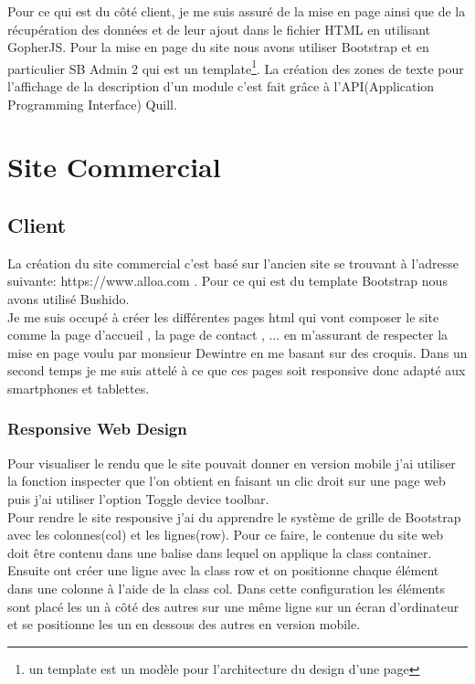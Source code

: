 \documentclass[12pt,a4paper]{report}
\begin{document}
Pour ce qui est du côté client, je me suis assuré de la mise en page ainsi que de la  récupération des données et de leur ajout dans le fichier HTML en utilisant GopherJS. Pour la mise en page du site nous avons utiliser Bootstrap et en particulier SB Admin 2 qui est un template\footnote{un template est un modèle pour l'architecture du design d'une page }. La création des zones de texte pour l'affichage de la description d'un module c'est fait grâce à l'API(Application Programming Interface) Quill.

\section{Site Commercial}

\subsection{Client}

La création du site commercial c'est basé sur l'ancien site  se trouvant à l'adresse suivante: https://www.alloa.com . Pour ce qui est du template Bootstrap nous avons utilisé Bushido. \\

 Je me suis occupé à créer les différentes pages html qui vont composer le site comme la page d'accueil , la page de contact , ... en m'assurant de respecter la mise en page voulu par monsieur Dewintre en me basant sur des croquis. Dans un second temps je me suis attelé à ce que ces pages soit responsive donc adapté aux smartphones et tablettes.\\




\subsubsection{Responsive Web Design}
Pour visualiser le rendu que le site pouvait donner en version mobile j'ai utiliser la fonction inspecter que l'on obtient en faisant un clic droit sur une page web puis j'ai utiliser l'option Toggle device toolbar.\\

Pour rendre le site responsive j'ai du apprendre le système de grille de Bootstrap avec les colonnes(col) et les lignes(row). Pour ce faire, le contenue du site web doit être contenu dans une balise dans lequel on applique la class container. Ensuite ont créer une ligne avec la class row et on positionne chaque élément dans une colonne à l'aide de la class col. Dans cette configuration les éléments sont placé les un à côté des autres sur une même ligne sur un écran d'ordinateur et se positionne les un en dessous des autres en version mobile.\\
\end{document}
